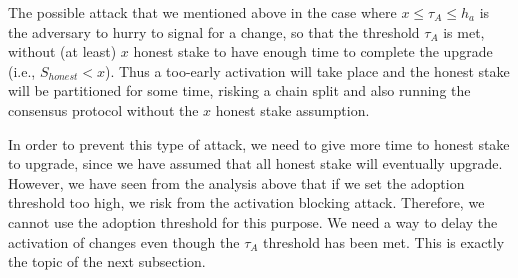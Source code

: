 The possible attack that we mentioned above in the case where $x \leq \tau_A \leq h_a$ is the adversary to hurry to signal for a change, so that the threshold $\tau_A$ is met, without (at least) $x$ honest stake to have enough time to complete the upgrade (i.e., $S_{honest} < x$). Thus a too-early activation will take place and the honest stake will be partitioned for some time, risking a chain split and also running the consensus protocol without the $x$ honest stake assumption.

In order to prevent this type of attack, we need to give more time to honest stake to upgrade, since we have assumed that all honest stake will eventually upgrade. However, we have seen from the analysis above that if we set the adoption threshold too high, we risk from the activation blocking attack. Therefore, we cannot use the adoption threshold for this purpose. We need a way to delay the activation of changes
even though the $\tau_A$ threshold has been met. This is exactly the topic of the next subsection.




